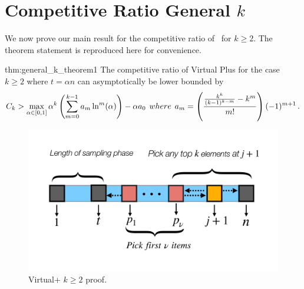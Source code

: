 \section{Competitive Ratio General $k$}
\label{app:general_k_proof}
We now prove our main result for the competitive ratio of \algoname \ for $k \geq 2$. The theorem statement is reproduced here for convenience.  
\begin{reptheorem}{thm:general_k_theorem1}
The competitive ratio of Virtual Plus for the case $k \geq 2$ where $t = \alpha n$ can asymptotically be lower bounded by 
\begin{equation}
    C_k >  \max_{\alpha \in [0,1]}  {\alpha}^k \left(\sum_{m = 0}^{k - 1} a_m \ln^m (\alpha)\right) - \alpha a_0
    \hspace{0.15cm }where  \hspace{0.15cm }
    a_m = \left(\frac{\frac{k^k}{(k-1)^{k-m}} - k^m}{m!}\right)(-1)^{m+1}
    \, .
\end{equation}

\end{reptheorem}
\begin{figure}[ht]
    \centering
    \includegraphics[width=1.0\linewidth]{Figures/general_k.pdf}
    \caption{Virtual+ $k \geq 2$ proof.}
    \label{fig:general_k}
    \vspace{-15pt}
\end{figure}

